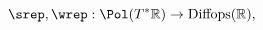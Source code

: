 \begin{equation}
    \label{eq:repisodiffops}
    \srep, \wrep: \Pol (T^*\mathbb{R}) \to \mathrm{Diffops} (\mathbb{R}),
\end{equation}

